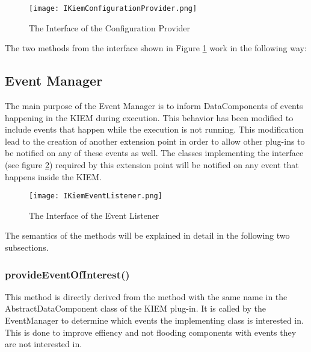 \begin{figure}[Configuration Provider Interface]
  \centering
  \texttt{[image: IKiemConfigurationProvider.png]}
  \caption[The Interface of the Configuration Provider]%
  {The Interface of the Configuration Provider\protect\footnotemark}
  \label{fig:UMLConfigurationProvider}
\end{figure}

The two methods from the interface shown in Figure \ref{fig:UMLConfigurationProvider} work
in the following way:




\subsection{Event Manager}
The main purpose of the Event Manager is to inform DataComponents of events
happening in the \ac{KIEM} during execution. This behavior has been modified to include 
events that happen while the execution is not running. This modification lead to the 
creation of another extension point in order to allow other plug-ins to be notified
on any of these events as well. The classes implementing the interface 
(see figure \ref{fig:UMLEventListener}) required by this extension point will be notified
on any event that happens inside the \ac{KIEM}.

\begin{figure}[Event Listener Interface]
  \centering
  \texttt{[image: IKiemEventListener.png]}
  \caption[The Interface of the Event Listener]%
  {The Interface of the Event Listener\protect\footnotemark}
  \label{fig:UMLEventListener}
\end{figure}

The semantics of the methods will be explained in detail in the following two subsections.

\subsubsection*{provideEventOfInterest()}
This method is directly derived from the method with the same name in the AbstractDataComponent class
of the \ac{KIEM} plug-in. It is called by the EventManager to determine which events the implementing
class is interested in. This is done to improve effiency and not flooding components with events
they are not interested in.

